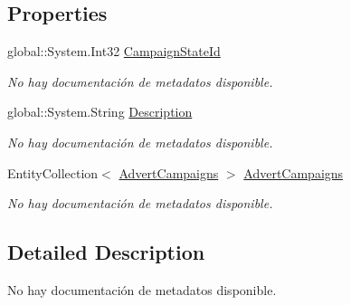 \subsection*{Properties}
\begin{DoxyCompactItemize}
\item 
global\-::\-System.\-Int32 \hyperlink{class_microsoft_1_1_samples_1_1_kinect_1_1_basic_interactions_1_1_campaign_states_a70e6151ff27f5191123c0e45e37a8b19}{Campaign\-State\-Id}
\begin{DoxyCompactList}\small\item\em No hay documentación de metadatos disponible. \end{DoxyCompactList}\item 
global\-::\-System.\-String \hyperlink{class_microsoft_1_1_samples_1_1_kinect_1_1_basic_interactions_1_1_campaign_states_a20844767c8e82f9ee3ebb462c8164c0a}{Description}
\begin{DoxyCompactList}\small\item\em No hay documentación de metadatos disponible. \end{DoxyCompactList}\item 
Entity\-Collection$<$ \hyperlink{class_microsoft_1_1_samples_1_1_kinect_1_1_basic_interactions_1_1_advert_campaigns}{Advert\-Campaigns} $>$ \hyperlink{class_microsoft_1_1_samples_1_1_kinect_1_1_basic_interactions_1_1_campaign_states_aa5ee6382ca7fef077e955b486374ddb4}{Advert\-Campaigns}
\begin{DoxyCompactList}\small\item\em No hay documentación de metadatos disponible. \end{DoxyCompactList}\end{DoxyCompactItemize}


\subsection{Detailed Description}
No hay documentación de metadatos disponible. 



